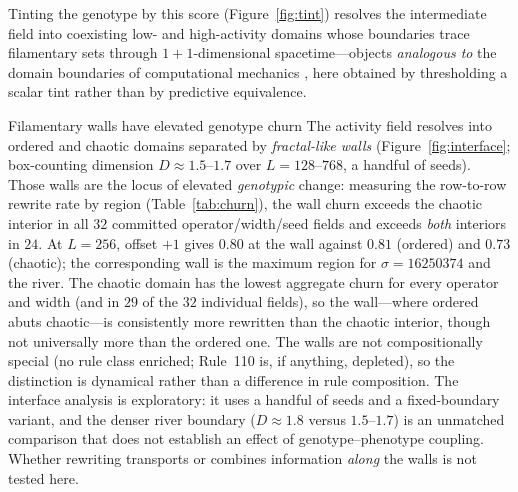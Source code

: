 \documentclass[man,12pt,floatsintext,donotrepeattitle]{apa7}
\begin{document}
Tinting the genotype by this score (Figure~\ref{fig:tint}) resolves the
intermediate field into coexisting low- and high-activity domains whose
boundaries trace filamentary sets through $1{+}1$-dimensional spacetime---objects
\emph{analogous to} the domain boundaries of computational mechanics
\parencite{crutchfield1989inferring,shalizi2001computational}, here obtained by
thresholding a scalar tint rather than by predictive equivalence.

\begin{empiricalfinding}[label={find:walls}]{Filamentary walls have elevated genotype churn}
The activity field resolves into ordered and chaotic domains separated by
\emph{fractal-like walls} (Figure~\ref{fig:interface}; box-counting dimension
$D \approx 1.5$--$1.7$ over $L = 128$--$768$, a handful of seeds). Those walls are
the locus of elevated \emph{genotypic} change: measuring the row-to-row rewrite
rate by region (Table~\ref{tab:churn}), the wall churn exceeds the chaotic
interior in all $32$ committed operator/width/seed fields and exceeds
\emph{both} interiors in $24$. At $L = 256$, offset $+1$ gives $0.80$ at the
wall against $0.81$ (ordered) and $0.73$ (chaotic); the corresponding wall is
the maximum region for $\sigma=16250374$ and the river. The chaotic domain has
the lowest aggregate churn for every operator and width (and in $29$ of the
$32$ individual fields), so the wall---where ordered abuts chaotic---is
consistently more rewritten than the chaotic interior, though not universally
more than the ordered one. The walls are not compositionally special (no rule
class enriched; Rule~110 is, if anything, depleted), so the distinction is
dynamical rather than a difference in rule composition. The interface analysis
is exploratory: it uses a handful of seeds and a fixed-boundary variant, and
the denser river boundary ($D\approx1.8$ versus $1.5$--$1.7$) is an unmatched
comparison that does not establish an effect of genotype--phenotype coupling.
Whether rewriting transports or combines information \emph{along} the walls is
not tested here.
\end{empiricalfinding}
\end{document}
